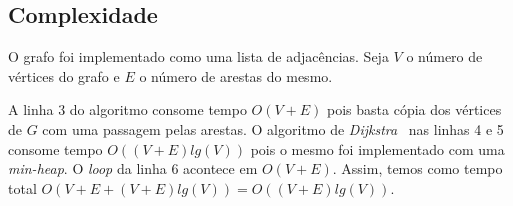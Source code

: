 \documentclass[7pt]{article}
\newcommand{\tit}[1]{\textit{#1}}
\begin{document}
\begin{multicols}{2}
\section{Complexidade}
O grafo foi implementado como uma lista de adjacências.
Seja $V$ o número de vértices do grafo e $E$ o número de arestas do mesmo.

A linha 3 do algoritmo consome tempo $O(V + E)$ pois basta cópia dos vértices
de $G$ com uma passagem pelas arestas.
O algoritmo de \tit{Dijkstra}~\cite{clrs} nas linhas 4 e 5 consome tempo
$O((V + E)lg(V))$ pois o mesmo foi implementado com uma \tit{min-heap}.
O \tit{loop} da linha 6 acontece em $O(V + E)$.
Assim, temos como tempo total $O(V + E + (V + E)lg(V)) = O((V + E)lg(V))$.

\printbibliography

\end{multicols}
\end{document}
